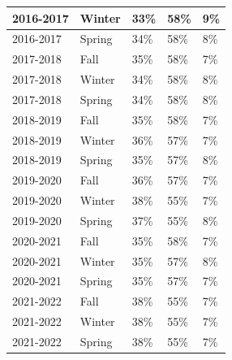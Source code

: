 \documentclass[10pt]{article}
\begin{document}
\begin{longtable}[c]{|l|l|l|l|l|}
	2016-2017              & Winter        & 33\%           & 58\%             & 9\%              \\ \hline
	2016-2017              & Spring        & 34\%           & 58\%             & 8\%              \\ \hline
	2017-2018              & Fall          & 35\%           & 58\%             & 7\%              \\ \hline
	2017-2018              & Winter        & 34\%           & 58\%             & 8\%              \\ \hline
	2017-2018              & Spring        & 34\%           & 58\%             & 8\%              \\ \hline
	2018-2019              & Fall          & 35\%           & 58\%             & 7\%              \\ \hline
	2018-2019              & Winter        & 36\%           & 57\%             & 7\%              \\ \hline
	2018-2019              & Spring        & 35\%           & 57\%             & 8\%              \\ \hline
	2019-2020              & Fall          & 36\%           & 57\%             & 7\%              \\ \hline
	2019-2020              & Winter        & 38\%           & 55\%             & 7\%              \\ \hline
	2019-2020              & Spring        & 37\%           & 55\%             & 8\%              \\ \hline
	2020-2021              & Fall          & 35\%           & 58\%             & 7\%              \\ \hline
	2020-2021              & Winter        & 35\%           & 57\%             & 8\%              \\ \hline
	2020-2021              & Spring        & 35\%           & 57\%             & 7\%              \\ \hline
	2021-2022              & Fall          & 38\%           & 55\%             & 7\%              \\ \hline
	2021-2022              & Winter        & 38\%           & 55\%             & 7\%              \\ \hline
	2021-2022              & Spring        & 38\%           & 55\%             & 7\%              \\ \hline
\end{longtable}
\end{document}
